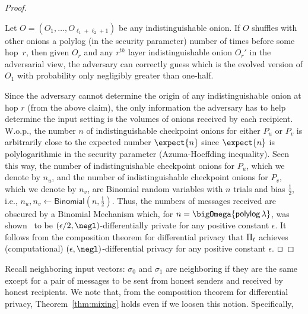 \documentclass[runningheads,a4paper]{llncs}
\begin{document}
\begin{proof}
\begin{lemma} \label{clm:main}
Let $O = (O_{1}, \dots, O_{\ell_1+\ell_2+1})$ be any indistinguishable onion. 
If $O$ shuffles with other onions a polylog (in the security parameter) number of times before some hop~$r$, then given $O_r$ and any $r^{th}$ layer indistinguishable onion $O_r'$ in the adversarial view, the adversary can correctly guess which is the evolved version of $O_1$ with probability only negligibly greater than one-half. 
\end{lemma}

Since the adversary cannot determine the origin of any indistinguishable onion at hop $r$ (from the above claim), the only information the adversary has to help determine the input setting is the volumes of onions received by each recipient. W.o.p., the number $n$ of indistinguishable checkpoint onions for either $P_u$ or $P_v$ is arbitrarily close to the expected number $\expect{n}$ since $\expect{n}$ is polylogarithmic in the security parameter (Azuma-Hoeffding inequality). Seen this way, the number of indistinguishable checkpoint onions for $P_u$, which we denote by $n_u$, and the number of indistinguishable checkpoint onions for $P_v$, which we denote by $n_v$, are Binomial random variables with $n$ trials and bias $\frac{1}{2}$, i.e., $n_u, n_v \gets \mathsf{Binomial}(n, \frac{1}{2})$. 
Thus, the numbers of messages received are obscured by a Binomial Mechanism which, for $n = \bigOmega{\polylog \thinspace \secpar}$, was shown~\cite{EC:DKMMN06} to be $(\epsilon/2, \negl)$-differentially private for any positive constant $\epsilon$. 
It follows from the composition theorem for differential privacy that $\Pi_t$ achieves (computational) $(\epsilon, \negl)$-differential privacy for any positive constant $\epsilon$. 
\hfill$\qed$
\end{proof}


Recall neighboring input vectors: $\sigma_0$ and $\sigma_1$ are neighboring if they are the same except for a pair of messages to be sent from honest senders and received by honest recipients. We note that, from the composition theorem for differential privacy, Theorem~\ref{thm:mixing} holds even if we loosen this notion. Specifically, 
\end{document}
